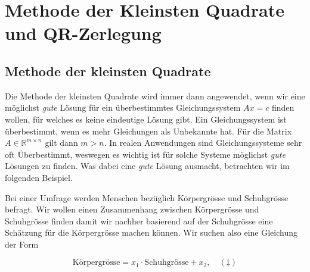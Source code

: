 \setcounter{section}{8}
\section{Methode der Kleinsten Quadrate und QR-Zerlegung}

\subsection{Methode der kleinsten Quadrate}

Die Methode der kleinsten Quadrate wird immer dann angewendet, wenn wir eine möglichst \textit{gute} Lösung für ein überbestimmtes Gleichungssystem \( Ax = c\) finden wollen, für welches es keine eindeutige Lösung gibt. Ein Gleichungssystem ist überbestimmt, wenn es mehr Gleichungen als Unbekannte hat. Für die Matrix \( A \in \mathbb{R}^{m \times n} \) gilt dann \(m > n \). In realen Anwendungen sind Gleichungssysteme sehr oft Überbestimmt, weswegen es wichtig ist für solche Systeme möglichst \textit{gute} Lösungen zu finden. Was dabei eine \textit{gute} Lösung ausmacht, betrachten wir im folgenden Beispiel. 

\vspace{1\baselineskip}

Bei einer Umfrage werden Menschen bezüglich Körpergrösse und Schuhgrösse befragt. Wir wollen einen Zusammenhang zwischen Körpergrösse und Schuhgrösse finden damit wir nachher basierend auf der Schuhgrösse eine Schätzung für die Körpergrösse machen können. Wir suchen also eine Gleichung der Form

\begin{figure*}[h]
    \centering
    \begin{minipage}
        {0.5\textwidth}
        \begin{equation*}
            \text{Körpergrösse} = x_1\cdot \text{Schuhgrösse} + x_2, \quad (\ddagger)
        \end{equation*}        
    \end{minipage}
    \hfill
    \begin{minipage}
        {0.45\textwidth}
        \centering
    \end{minipage}
\end{figure*}
    


